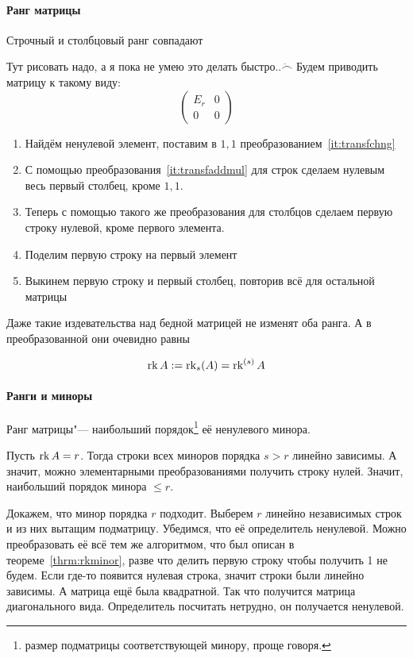 \documentclass[12pt]{../../../notes}
\begin{document}
\paragraph{Ранг матрицы}


\begin{thrm}\label{thrm:rowrk=colrk}
  Строчный и столбцовый ранг совпадают
\end{thrm}
\begin{ittproof}
  Тут рисовать надо, а я пока не умею это делать быстро..$\ddot{\frown}$
  Будем приводить матрицу к такому виду:
  \[
    \left(
    \begin{array}{c|c}
      E_r & 0 \\ \hline
      0   & 0
    \end{array}
    \right)
  \]
  \begin{enumerate}
    \item Найдём ненулевой элемент, поставим в $1,1$ преобразованием~\ref{it:transfchng}
    \item С помощью преобразования~\ref{it:transfaddmul} для строк сделаем нулевым весь первый
      столбец, кроме $1,1$. 
    \item Теперь с помощью такого же преобразования для столбцов сделаем первую строку нулевой,
      кроме первого элемента.
    \item Поделим первую строку на первый элемент
    \item Выкинем первую строку и первый столбец, повторив всё для остальной матрицы
  \end{enumerate}
  Даже такие издевательства над бедной матрицей не изменят оба ранга.
  А в преобразованной они очевидно равны
\end{ittproof}

\begin{defn}\label{defn:mtxrank}
  \[
    \operatorname{rk} A := \operatorname{rk}_s (A) = \operatorname{rk}^{(s)} A
  \]
\end{defn}

\paragraph{Ранги и миноры}
\begin{thrm}\label{thrm:rkminor}
  Ранг матрицы"--- наибольший порядок\footnote{размер подматрицы соответствующей минору, проще
  говоря.} её ненулевого минора.
\end{thrm}
\begin{ittproof}
  Пусть $\operatorname{rk} A = r$. Тогда строки всех миноров порядка $s > r$ линейно зависимы. А значит, можно 
  элементарными преобразованиями получить строку нулей. Значит, наибольший порядок минора
  $\leqslant r$. 

  Докажем, что минор порядка $r$ подходит. Выберем $r$ линейно независимых строк и из них вытащим
  подматрицу. Убедимся, что её определитель ненулевой.
  Можно преобразовать её всё тем же алгоритмом, что был описан в теореме~\ref{thrm:rkminor},
  разве что делить первую строку чтобы получить 1 не будем.
  Если где-то появится нулевая строка, значит строки были линейно зависимы. А матрица ещё была
  квадратной. Так что получится матрица диагонального вида. Определитель посчитать нетрудно, он
  получается ненулевой.
\end{ittproof}
\end{document}
